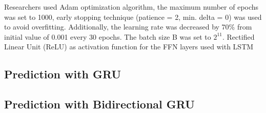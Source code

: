 Researchers used Adam optimization algorithm, the maximum number of epochs was set to 1000, early stopping technique (patience = 2, min. delta = 0) was used to avoid overfitting. Additionally, the learning rate was decreased by 70\% from initial value of 0.001 every 30 epochs. The batch size B was set to $2^{11}$. Rectified Linear Unit (ReLU) as activation function for the FFN layers used with LSTM

\subsection{Prediction with GRU}
\label{sec:eval:experiments:gru}

\subsection{Prediction with Bidirectional GRU}
\label{sec:eval:experiments:bi-gru}
